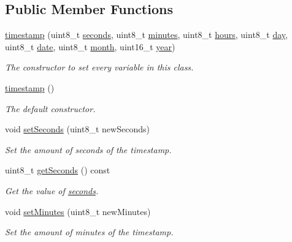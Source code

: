 \subsection*{Public Member Functions}
\begin{DoxyCompactItemize}
\item 
\mbox{\hyperlink{classtimestamp_adcd43bf86d093792baa6b406e0acafd3}{timestamp}} (uint8\+\_\+t \mbox{\hyperlink{classtimestamp_a15ad236c6963bfbd6ae18416697c91c2}{seconds}}, uint8\+\_\+t \mbox{\hyperlink{classtimestamp_a45c06ef17b96bdd37cd168faf772c63c}{minutes}}, uint8\+\_\+t \mbox{\hyperlink{classtimestamp_a3b2f11626563cca00d60b323ceb15191}{hours}}, uint8\+\_\+t \mbox{\hyperlink{classtimestamp_a0102d6c44b2cc194a8186a42ff2bd58b}{day}}, uint8\+\_\+t \mbox{\hyperlink{classtimestamp_a7eb2eee5f6ef4258aab7779a639a93fd}{date}}, uint8\+\_\+t \mbox{\hyperlink{classtimestamp_a71df69b7ebb5a6dd228f4ae70b954505}{month}}, uint16\+\_\+t \mbox{\hyperlink{classtimestamp_a6df342bdd1101cf67f9a4831d5372d58}{year}})
\begin{DoxyCompactList}\small\item\em The constructor to set every variable in this class. \end{DoxyCompactList}\item 
\mbox{\hyperlink{classtimestamp_a155539f65cabcec4ed8120e7d531d92a}{timestamp}} ()
\begin{DoxyCompactList}\small\item\em The default constructor. \end{DoxyCompactList}\item 
void \mbox{\hyperlink{classtimestamp_a7d2a5311e064fb9fe0ebbb74e603091c}{set\+Seconds}} (uint8\+\_\+t new\+Seconds)
\begin{DoxyCompactList}\small\item\em Set the amount of seconds of the timestamp. \end{DoxyCompactList}\item 
uint8\+\_\+t \mbox{\hyperlink{classtimestamp_a9212a15c81b0f77b576257cba2805253}{get\+Seconds}} () const
\begin{DoxyCompactList}\small\item\em Get the value of \mbox{\hyperlink{classtimestamp_a15ad236c6963bfbd6ae18416697c91c2}{seconds}}. \end{DoxyCompactList}\item 
void \mbox{\hyperlink{classtimestamp_a95383562b21c79d2d3279f4c06a8cc18}{set\+Minutes}} (uint8\+\_\+t new\+Minutes)
\begin{DoxyCompactList}\small\item\em Set the amount of minutes of the timestamp. \end{DoxyCompactList}\item 

\end{DoxyCompactItemize}
